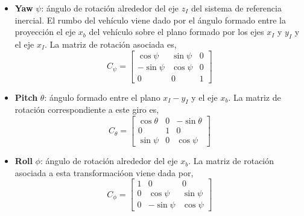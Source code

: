 \documentclass[a4paper,12pt]{book}
\begin{document}
\begin{itemize}
    \item \textbf{Yaw} $\psi$: ángulo de rotación alrededor del eje $z_I$ del sistema de referencia inercial. El rumbo del vehículo viene dado por el ángulo formado entre la proyección el eje $x_b$ del vehículo sobre el plano formado por los ejes $x_I$ y $y_I$ y el eje $x_I$. La matriz de rotación asociada es,
    \begin{equation}
         C_\psi = \begin{bmatrix} \cos\psi & \sin\psi & 0 \\ -\sin\psi & \cos\psi & 0 \\ 0 & 0 & 1 \end{bmatrix}
    \end{equation}
    \item \textbf{Pitch} $\theta$: ángulo formado entre el plano $x_I-y_I$ y el eje $x_b$. La matriz de rotación correspondiente a este giro es,
    \begin{equation}
         C_\theta = \begin{bmatrix} \cos\theta & 0 & -\sin\theta \\ 0 & 1 & 0\\ \sin\psi & 0 & \cos\psi  \end{bmatrix}
    \end{equation}
    \item \textbf{Roll} $\phi$: ángulo de rotación alrededor del eje $x_b$. La matriz de rotación asociada a esta transformacióon viene dada por,
    \begin{equation}
         C_\phi= \begin{bmatrix} 1 & 0 & 0\\ 0 &\cos\psi & \sin\psi \\ 0 & -\sin\psi & \cos\psi  \end{bmatrix}
    \end{equation}
\end{itemize}
\end{document}
